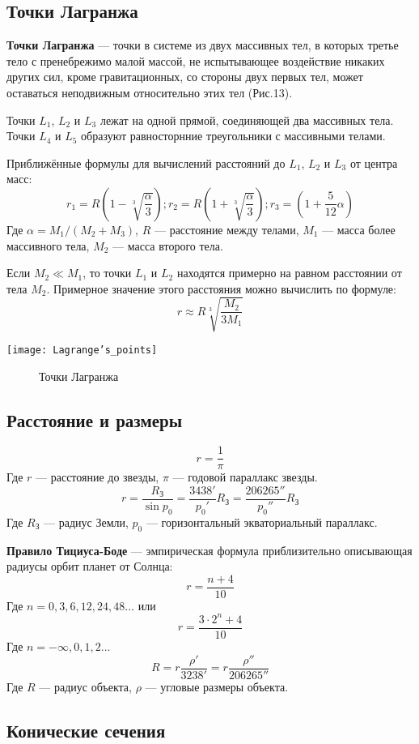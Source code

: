 \documentclass[10pt,a5paper]{article}
\begin{document}
\subsection*{Точки Лагранжа}

\textbf{Точки Лагранжа} --- точки в системе из двух массивных тел, в которых третье тело с пренебрежимо малой массой, не испытывающее воздействие никаких других сил, кроме гравитационных, со стороны двух первых тел, может оставаться неподвижным относительно этих тел (Рис.13).

Точки $L_1$, $L_2$ и $L_3$ лежат на одной прямой, соединяющей два массивных тела. Точки $L_4$ и $L_5$ образуют равносторнние треугольники с массивными телами.

Приближённые формулы для вычислений расстояний до $L_1$, $L_2$ и $L_3$ от центра масс:
$$r_1=R\left(1-\sqrt[3]{\frac{\alpha}{3}}\right); r_2=R\left(1+\sqrt[3]{\frac{\alpha}{3}}\right); r_3=\left(1+\frac{5}{12}\alpha\right)$$
Где $\alpha=M_1/(M_2+M_3)$, $R$ --- расстояние между телами, $M_1$ --- масса более массивного тела, $M_2$ --- масса второго тела.

Если $M_2\ll M_1$, то точки $L_1$ и $L_2$ находятся примерно на равном расстоянии от тела $M_2$. Примерное значение этого расстояния можно вычислить по формуле:
$$r\approx R\sqrt[3]{\frac{M_2}{3M_1}}$$
\begin{center}
\texttt{[image: Lagrange's\_points]}
\begin{figure}[h!]
\caption{Точки Лагранжа}
\end{figure}
\end{center}
\subsection*{Расстояние и размеры}
$$r=\frac{1}{\pi}$$
Где $r$ --- расстояние до звезды, $\pi$ --- годовой параллакс звезды.
$$r=\frac{R_{\text{З}}}{\sin p_0}=\frac{3438'}{p_0'}R_{\text{З}}=\frac{206265''}{p_0''}R_{\text{З}}$$
Где $R_{\text{З}}$ --- радиус Земли, $p_0$ --- горизонтальный экваториальный параллакс.

\textbf{Правило Тициуса-Боде} --- эмпирическая формула приблизительно описывающая радиусы орбит планет от Солнца:
$$r=\frac{n+4}{10}$$
Где $n=0, 3 ,6, 12, 24, 48...$ или
$$r=\frac{3\cdot 2^n+4}{10}$$
Где $n=-\infty, 0, 1, 2...$
$$R=r\frac{\rho'}{3238'}=r\frac{\rho''}{206265''}$$
Где $R$ --- радиус объекта, $\rho$ --- угловые размеры объекта.
\begin{center}
\section*{Конические сечения}
\end{center}
\end{document}
